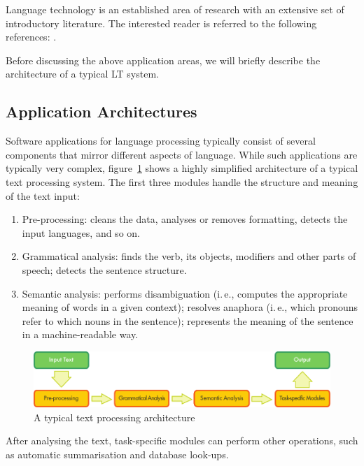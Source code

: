 \documentclass[]{../../metanetpaper}
\begin{document}
\begin{multicols}{2}
Language technology is an established area of research with an extensive set of introductory literature. The interested reader is referred to the following references:  \cite{carstensen-etal1, jurafsky-martin01, manning-schuetze1, lt-world1, lt-survey1}.

Before discussing the above application areas, we will briefly describe the architecture of a typical LT system.

\subsection{Application Architectures}

Software applications for language processing typically consist of several components that mirror different aspects of language. While such applications are typically very complex, figure~\ref{fig:textprocessingarch_en} shows a highly simplified architecture of a typical text processing system. The first three modules handle the structure and meaning of the text input:

\begin{enumerate}
\item Pre-processing: cleans the data, analyses or removes formatting, detects the input languages, and so on.
\item Grammatical analysis: finds the verb, its objects, modifiers and other parts of speech; detects the sentence structure.
\item Semantic analysis: performs disambiguation (i.\,e., computes the appropriate meaning of words in a given context); resolves anaphora (i.\,e., which pronouns refer to which nouns in the sentence); represents the meaning of the sentence in a machine-readable way.
\end{enumerate}

\begin{figure}[htb]
  \center
  \includegraphics[width=\textwidth]{../_media/english/text_processing_app_architecture}
  \caption{A typical text processing architecture}
  \label{fig:textprocessingarch_en}
\end{figure}

After analysing the text, task-specific modules can perform other operations, such as automatic summarisation and database look-ups.


\end{multicols}
\end{document}
